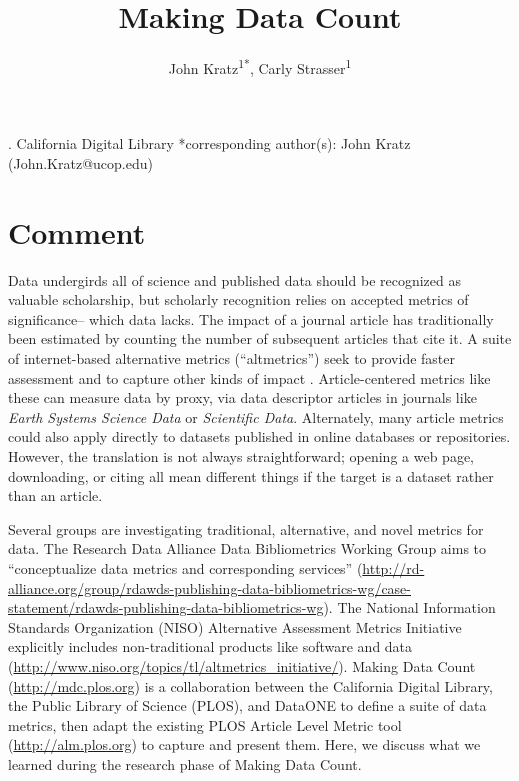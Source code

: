 \documentclass[english]{article}
\begin{document}
\title{Making Data Count}


\author{John Kratz\textsuperscript{1{*}}, Carly Strasser\textsuperscript{1}}

. California Digital Library 
{*}corresponding author(s): John Kratz (John.Kratz@ucop.edu)


\section*{Comment}


Data undergirds all of science and published data should be recognized as valuable scholarship, but scholarly recognition relies on accepted metrics of significance-- which data lacks.
The impact of a journal article has traditionally been estimated by counting the number of subsequent articles that cite it. 
A suite of internet-based alternative metrics (``altmetrics'') seek to provide faster assessment and to capture other kinds of impact \cite{priem_altmetrics_2012}.
Article-centered metrics like these can measure data by proxy, via data descriptor articles in journals like \textit{Earth Systems Science Data} or \textit{Scientific Data}\cite{pfeiffenberger_earth_2011, editors_more_2014}.
Alternately, many article metrics could also apply directly to datasets published in online databases or repositories.
However, the translation is not always straightforward; opening a web page, downloading, or citing all mean different things if the target is a dataset rather than an article.

Several groups are investigating traditional, alternative, and novel metrics for data. 
The Research Data Alliance Data Bibliometrics Working Group aims to ``conceptualize data metrics and corresponding services'' (\url{http://rd-alliance.org/group/rdawds-publishing-data-bibliometrics-wg/case-statement/rdawds-publishing-data-bibliometrics-wg}{}). 
The National Information Standards Organization (NISO) Alternative Assessment Metrics Initiative explicitly includes non-traditional products like software and data (\url{http://www.niso.org/topics/tl/altmetrics_initiative/}).  
Making Data Count (\url{http://mdc.plos.org}) is a collaboration between the California Digital Library, the Public Library of Science (PLOS), and DataONE to define a suite of data metrics, then adapt the existing PLOS Article Level Metric tool (\url{http://alm.plos.org}) to capture and present them.
Here, we discuss what we learned during the research phase of Making Data Count.
\end{document}
